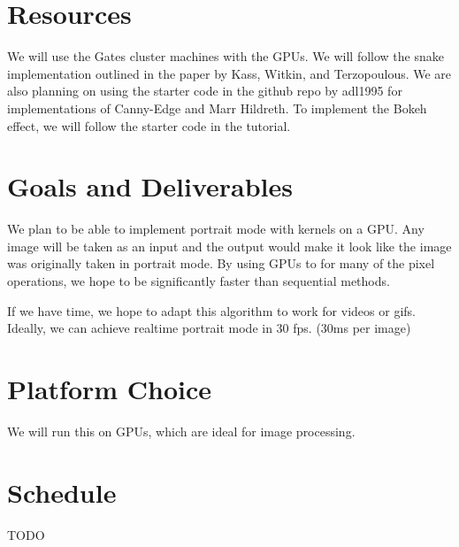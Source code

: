 \documentclass[12pt]{article}
\begin{document}
\section*{Resources}

We will use the Gates cluster machines with the GPUs. We will follow the snake
implementation outlined in the paper by Kass, Witkin, and Terzopoulous.
\cite{paper} We are also planning on using the starter code in the github repo
by adl1995 for implementations of Canny-Edge and Marr Hildreth. \cite{edge} To
implement the Bokeh effect, we will follow the starter code in the tutorial.
\cite{bokeh}

\section*{Goals and Deliverables}

We plan to be able to implement portrait mode with kernels on a GPU. Any image
will be taken as an input and the output would make it look like the image was
originally taken in portrait mode. By using GPUs to for many of the pixel
operations, we hope to be significantly faster than sequential methods.

If we have time, we hope to adapt this algorithm to work for videos or gifs.
Ideally, we can achieve realtime portrait mode in 30 fps. (30ms per image)

\section*{Platform Choice}

We will run this on GPUs, which are ideal for image processing.

\section*{Schedule}

TODO

\end{document}
